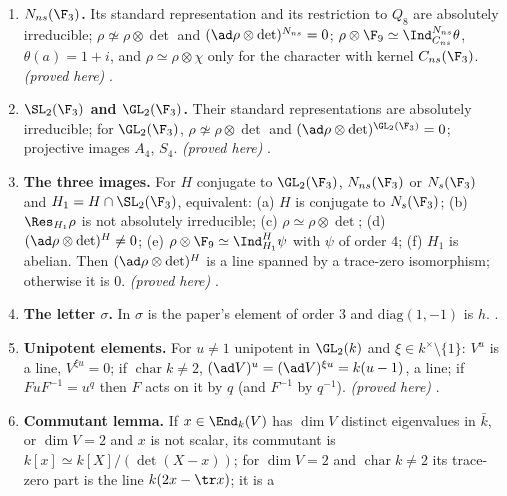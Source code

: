 \begin{enumerate}[label=\textbf{\thechapter.\arabic*}]
$v=(1,i)^t$, $\sigma v=(1,-i)^t$ of $\F_9^2$, $\rho(J)=\mathrm{diag}(i,-i)$ and $\rho(\sigma)=w$, so $\rho\otimes\F_9\simeq\Ind_{C_4}^{N_s}\psi$, $\psi(J)=i$; over $\F_3$, $\rho$
is not induced from $C_4$; $\rho\simeq\rho\otimes\chi$ for the three characters with kernels $C_4$, $C_s$, $\{\pm1,\pm w\}$, with intertwiners
$J$, $\sigma$, $w$; $(\ad\rho\otimes\det)^{N_s}=\F_3J$. \emph{(proved here)} .
\item \textbf{$N_{ns}(\F_3)$.} Its standard representation and its restriction to $Q_8$ are absolutely irreducible; $\rho\not\simeq\rho\otimes\det$ and
$(\ad\rho\otimes\det)^{N_{ns}}=0$; $\rho\otimes\F_9\simeq\Ind_{C_{ns}}^{N_{ns}}\theta$, $\theta(a)=1+i$, and $\rho\simeq\rho\otimes\chi$ only for the character with
kernel $C_{ns}(\F_3)$. \emph{(proved here)} .
\item \textbf{$\SL_2(\F_3)$ and $\GL_2(\F_3)$.} Their standard representations are absolutely irreducible; for $\GL_2(\F_3)$, $\rho\not\simeq\rho\otimes\det$
and $(\ad\rho\otimes\det)^{\GL_2(\F_3)}=0$; projective images $A_4$, $S_4$. \emph{(proved here)} .
\item \textbf{The three images.} For $H$ conjugate to $\GL_2(\F_3)$, $N_{ns}(\F_3)$ or $N_s(\F_3)$ and $H_1=H\cap\SL_2(\F_3)$, equivalent: (a) $H$ is
conjugate to $N_s(\F_3)$; (b) $\Res_{H_1}\rho$ is not absolutely irreducible; (c) $\rho\simeq\rho\otimes\det$; (d) $(\ad\rho\otimes\det)^H\ne0$;
(e) $\rho\otimes\F_9\simeq\Ind_{H_1}^H\psi$ with $\psi$ of order $4$; (f) $H_1$ is abelian. Then $(\ad\rho\otimes\det)^H$ is a line spanned by a
trace-zero isomorphism; otherwise it is $0$. \emph{(proved here)} .
\item \textbf{The letter $\sigma$.} In  $\sigma$ is the paper's element of order $3$ and $\mathrm{diag}(1,-1)$ is $h$.
.
\item \textbf{Unipotent elements.} For $u\ne1$ unipotent in $\GL_2(k)$ and $\xi\in k^\times\setminus\{1\}$: $V^u$ is a line, $V^{\xi u}=0$; if
$\operatorname{char}k\ne2$, $(\ad V)^u=(\ad V)^{\xi u}=k(u-1)$, a line; if $FuF^{-1}=u^q$ then $F$ acts on it by $q$ (and $F^{-1}$ by $q^{-1}$).
\emph{(proved here)} .
\item \textbf{Commutant lemma.} If $x\in\End_k(V)$ has $\dim V$ distinct eigenvalues in $\bar k$, or $\dim V=2$ and $x$ is not scalar, its
commutant is $k[x]\simeq k[X]/(\det(X-x))$; for $\dim V=2$ and $\operatorname{char}k\ne2$ its trace-zero part is the line $k(2x-\tr x)$; it is a

\end{enumerate}
